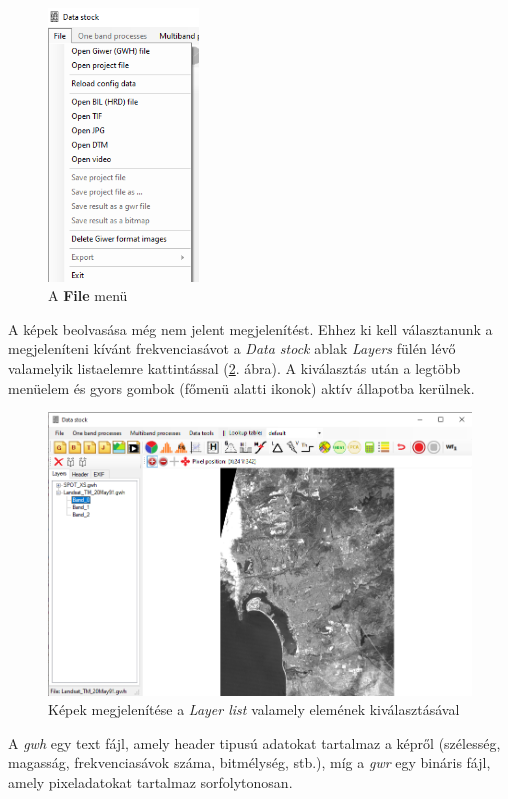 \documentclass[a4paper,12pt]{article}
\begin{document}
\begin{figure}
	\centering
	\includegraphics[width=4cm]{filemenu_datastock.png}
	\caption{A \textbf{File} menü}
	\label{fig:filemenu_datastock}
\end{figure}

 A képek beolvasása még nem jelent megjelenítést. Ehhez ki kell választanunk a megjeleníteni kívánt frekvenciasávot a \textit{Data stock} ablak \textit{Layers} fülén lévő valamelyik listaelemre kattintással (\ref{fig:layer_list}. ábra). A kiválasztás után a legtöbb menüelem és gyors gombok (főmenü alatti ikonok) aktív állapotba kerülnek.
 
\begin{figure}
	\centering
	\includegraphics[width=14cm]{layer_list.png}
	\caption{Képek megjelenítése a \textit{Layer list} valamely elemének kiválasztásával}
	\label{fig:layer_list}
\end{figure} 
	
A \textit{gwh} egy text fájl, amely header tipusú adatokat tartalmaz a képről (szélesség, magasság, frekvenciasávok száma, bitmélység, stb.), míg a \textit{gwr} egy bináris fájl, amely pixeladatokat tartalmaz sorfolytonosan. 
\end{document}
